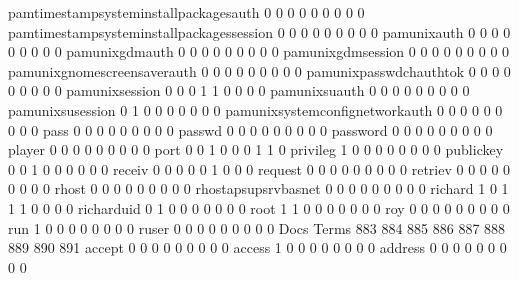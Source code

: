 \documentclass[compress,8pt]{beamer}
\begin{document}
\begin{frame}
\begin{Schunk}
  pamtimestampsysteminstallpackagesauth      0   0   0   0   0   0   0   0   0
  pamtimestampsysteminstallpackagessession   0   0   0   0   0   0   0   0   0
  pamunixauth                                0   0   0   0   0   0   0   0   0
  pamunixgdmauth                             0   0   0   0   0   0   0   0   0
  pamunixgdmsession                          0   0   0   0   0   0   0   0   0
  pamunixgnomescreensaverauth                0   0   0   0   0   0   0   0   0
  pamunixpasswdchauthtok                     0   0   0   0   0   0   0   0   0
  pamunixsession                             0   0   0   1   1   0   0   0   0
  pamunixsuauth                              0   0   0   0   0   0   0   0   0
  pamunixsusession                           0   1   0   0   0   0   0   0   0
  pamunixsystemconfignetworkauth             0   0   0   0   0   0   0   0   0
  pass                                       0   0   0   0   0   0   0   0   0
  passwd                                     0   0   0   0   0   0   0   0   0
  password                                   0   0   0   0   0   0   0   0   0
  player                                     0   0   0   0   0   0   0   0   0
  port                                       0   0   1   0   0   0   1   1   0
  privileg                                   1   0   0   0   0   0   0   0   0
  publickey                                  0   0   1   0   0   0   0   0   0
  receiv                                     0   0   0   0   0   1   0   0   0
  request                                    0   0   0   0   0   0   0   0   0
  retriev                                    0   0   0   0   0   0   0   0   0
  rhost                                      0   0   0   0   0   0   0   0   0
  rhostapsupsrvbasnet                        0   0   0   0   0   0   0   0   0
  richard                                    1   0   1   1   1   0   0   0   0
  richarduid                                 0   1   0   0   0   0   0   0   0
  root                                       1   1   0   0   0   0   0   0   0
  roy                                        0   0   0   0   0   0   0   0   0
  run                                        1   0   0   0   0   0   0   0   0
  ruser                                      0   0   0   0   0   0   0   0   0
                                          Docs
Terms                                      883 884 885 886 887 888 889 890 891
  accept                                     0   0   0   0   0   0   0   0   0
  access                                     1   0   0   0   0   0   0   0   0
  address                                    0   0   0   0   0   0   0   0   0

\end{Schunk}
\end{frame}
\end{document}
